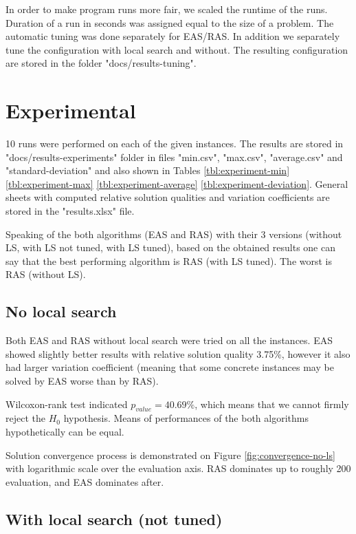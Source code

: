 \documentclass[12pt]{article}
\begin{document}
In order to make program runs more fair, we scaled the runtime of the runs. Duration of a run in seconds was assigned equal to the size of a problem. The automatic tuning was done separately for EAS/RAS. In addition we separately tune the configuration with local search and without. The resulting configuration are stored in the folder "docs/results-tuning".

\section{Experimental}

10 runs were performed on each of the given instances. The results are stored in "docs/results-experiments" folder in files "min.csv", "max.csv", "average.csv" and "standard-deviation" and also shown in Tables \ref{tbl:experiment-min} \ref{tbl:experiment-max} \ref{tbl:experiment-average} \ref{tbl:experiment-deviation}. General sheets with computed relative solution qualities and variation coefficients are stored in the "results.xlsx" file.

Speaking of the both algorithms (EAS and RAS) with their 3 versions (without LS, with LS not tuned, with LS tuned), based on the obtained results one can say that the best performing algorithm is RAS (with LS tuned). The worst is RAS (without LS).

\subsection{No local search}

Both EAS and RAS without local search were tried on all the instances. EAS showed slightly better results with relative solution quality 3.75\%, however it also had larger variation coefficient (meaning that some concrete instances may be solved by EAS worse than by RAS).

Wilcoxon-rank test indicated $p_{value} = 40.69\%$, which means that we cannot firmly reject the $H_0$ hypothesis. Means of performances of the both algorithms hypothetically can be equal.

Solution convergence process is demonstrated on Figure \ref{fig:convergence-no-ls} with logarithmic scale over the evaluation axis. RAS dominates up to roughly 200 evaluation, and EAS dominates after.


\subsection{With local search (not tuned)}
\end{document}
